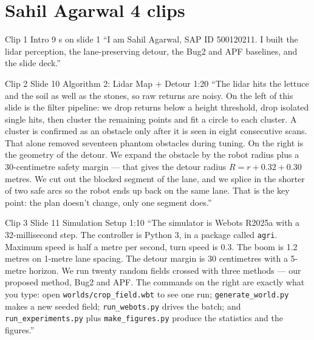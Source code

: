 \documentclass[11pt,a4paper]{article}
\begin{document}
\section*{\color{brand}Sahil Agarwal \textbullet{} 4 clips}

\begin{clipbox}{Clip 1 \textbullet{} Intro \textbullet{} 9 s \textbullet{} on slide 1}
``I am Sahil Agarwal, SAP ID 500120211. I built the lidar perception, the lane-preserving detour, the Bug2 and APF baselines, and the slide deck.''
\end{clipbox}

\begin{clipbox}{Clip 2 \textbullet{} Slide 10 Algorithm 2: Lidar Map + Detour \textbullet{} 1:20}
``The lidar hits the lettuce and the soil as well as the stones, so raw returns are noisy. On the left of this slide is the filter pipeline: we drop returns below a height threshold, drop isolated single hits, then cluster the remaining points and fit a circle to each cluster. A cluster is confirmed as an obstacle only after it is seen in eight consecutive scans. That alone removed seventeen phantom obstacles during tuning. On the right is the geometry of the detour. We expand the obstacle by the robot radius plus a 30-centimetre safety margin --- that gives the detour radius $R = r + 0.32 + 0.30$ metres. We cut out the blocked segment of the lane, and we splice in the shorter of two safe arcs so the robot ends up back on the same lane. That is the key point: the plan doesn't change, only one segment does.''
\end{clipbox}

\begin{clipbox}{Clip 3 \textbullet{} Slide 11 Simulation Setup \textbullet{} 1:10}
``The simulator is Webots R2025a with a 32-millisecond step. The controller is Python 3, in a package called \texttt{agri}. Maximum speed is half a metre per second, turn speed is 0.3. The boom is 1.2 metres on 1-metre lane spacing. The detour margin is 30 centimetres with a 5-metre horizon. We run twenty random fields crossed with three methods --- our proposed method, Bug2 and APF. The commands on the right are exactly what you type: open \texttt{worlds/crop\_field.wbt} to see one run; \texttt{generate\_world.py} makes a new seeded field; \texttt{run\_webots.py} drives the batch; and \texttt{run\_experiments.py} plus \texttt{make\_figures.py} produce the statistics and the figures.''
\end{clipbox}
\end{document}
